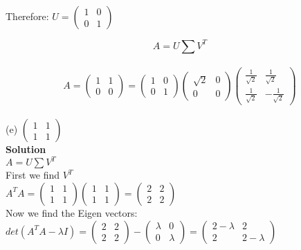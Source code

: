 \documentclass[12pt, oneside]{article}   	%
\begin{document}
\begin{enumerate}
	Therefore:
	$U= \left( \begin{array}{cc} 1&0 \\ 0& 1 \end{array} \right)$
	
	$$A=U\sum V^T$$\\
	
	$$A= \left( \begin{array}{cc} 1 & 1 \\ 0 & 0  \end{array} \right)= \left( \begin{array}{cc} 1&0 \\ 0& 1 \end{array} \right) \left( \begin{array}{cc} \sqrt{2} & 0 \\ 0 & 0 \end{array} \right) \left( \begin{array}{cc} \frac{1}{\sqrt{2}} & \frac{1}{\sqrt{2}} \\ \frac{1}{\sqrt{2}} & -\frac{1}{\sqrt{2}}  \end{array} \right)$$\\
	
	
	(e) $\left( \begin{array}{cc} 1 & 1 \\ 1 & 1  \end{array} \right)$\\
	
	\textbf{Solution}\\
	
	
	$A=U\sum V^T$\\
	
	First we find $V^T$ \\
	
	$A^TA =\left( \begin{array}{cc} 1 & 1 \\ 1 & 1 \end{array} \right) \left( \begin{array}{cc} 1 & 1 \\ 1 & 1 \end{array} \right) =\left( \begin{array}{cc} 2 & 2 \\ 2 & 2  \end{array} \right)$\\
	
	Now we find the Eigen vectors:
	$det(A^TA- \lambda I)= \left( \begin{array}{cc} 2 & 2 \\ 2 & 2  \end{array} \right)- \left( \begin{array}{cc} \lambda & 0 \\ 0 & \lambda  \end{array} \right) =\left( \begin{array}{cc} 2-\lambda & 2 \\ 2 & 2-\lambda  \end{array} \right)$\\
	

\end{enumerate}
\end{document}
